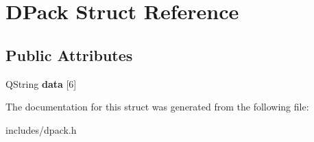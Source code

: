 \hypertarget{struct_d_pack}{
\section{DPack Struct Reference}
\label{struct_d_pack}
}
\subsection*{Public Attributes}
\begin{DoxyCompactItemize}
\item 
\hypertarget{struct_d_pack_afddb8374dde8ab256862ff6c01b5186c}{
QString {\bfseries data} \mbox{[}6\mbox{]}}
\label{struct_d_pack_afddb8374dde8ab256862ff6c01b5186c}

\end{DoxyCompactItemize}


The documentation for this struct was generated from the following file:\begin{DoxyCompactItemize}
\item 
includes/dpack.h\end{DoxyCompactItemize}
